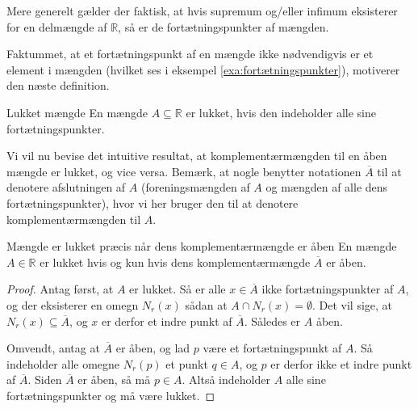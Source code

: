 Mere generelt gælder der faktisk, at hvis supremum og/eller infimum eksisterer for en delmængde af $\mathbb{R}$, så er de fortætningspunkter af mængden.

Faktummet, at et fortætningspunkt af en mængde ikke nødvendigvis er et element i mængden (hvilket ses i eksempel \ref{exa:fortætningspunkter}), motiverer den næste definition.

\begin{definition}[label=def:lukket]{Lukket mængde }{}
  En mængde $A \subseteq \mathbb{R}$ er lukket, hvis den indeholder alle sine fortætningspunkter. 
\end{definition}

Vi vil nu bevise det intuitive resultat, at komplementærmængden til en åben mængde er lukket, og vice versa.
Bemærk, at nogle benytter notationen $\overline A$ til at denotere afslutningen af $A$ (foreningsmængden af $A$ og mængden af alle dens fortætningspunkter), hvor vi her bruger den til at denotere komplementærmængden til $A$.

\begin{theorem}[label=theo:åben_lukket_komp]{Mængde er lukket præcis når dens komplementærmængde er åben}{}
  En mængde $A \in \mathbb{R}$ er lukket hvis og kun hvis dens komplementærmængde $\overline A$ er åben. 
\end{theorem}
\begin{proof} 
  Antag først, at $A$ er lukket.
  Så er alle $x \in \overline A$ ikke fortætningspunkter af $A$, og der eksisterer en omegn $N_r(x)$ sådan at $A \cap N_r(x)=\emptyset$. 
  Det vil sige, at $N_r(x) \subseteq \overline A$, og $x$ er derfor et indre punkt af $\overline A$.
  Således er $A$ åben. 

  Omvendt, antag at $\overline A$ er åben, og lad $p$ være et fortætningspunkt af $A$. 
  Så indeholder alle omegne $N_r(p)$ et punkt $q \in A$, og $p$ er derfor ikke et indre punkt af $\overline A$.
  Siden $\overline A$ er åben, så må $p \in A$.
  Altså indeholder $A$ alle sine fortætningspunkter og må være lukket. 
\end{proof}

